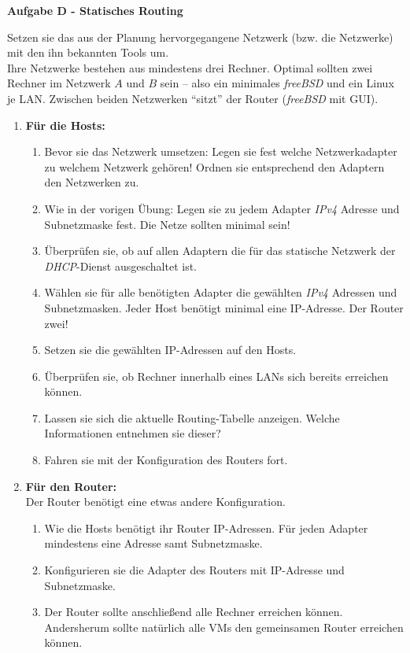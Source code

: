 \documentclass[paper=a4,fontsize=11pt]{scrartcl}%
\begin{document}
\begin{center}\Large{\textbf{Aufgabe D - Statisches Routing}}\end{center}\vskip0.25in
Setzen sie das aus der Planung hervorgegangene Netzwerk (bzw. die Netzwerke) mit den ihn bekannten Tools um.\\
Ihre Netzwerke bestehen aus mindestens drei Rechner. Optimal sollten zwei Rechner im Netzwerk $A$ und $B$ sein -- also ein minimales \emph{freeBSD} und ein Linux je LAN. Zwischen beiden Netzwerken \enquote{sitzt} der Router (\emph{freeBSD} mit GUI).
\begin{enumerate}
	\item \textbf{Für die Hosts:}\\
	\begin{enumerate}
		\item Bevor sie das Netzwerk umsetzen: Legen sie fest welche Netzwerkadapter zu welchem Netzwerk gehören! Ordnen sie entsprechend den Adaptern den Netzwerken zu.
		\item Wie in der vorigen Übung: Legen sie zu jedem Adapter \emph{IPv4} Adresse und Subnetzmaske fest. Die Netze sollten minimal sein!
		\item Überprüfen sie, ob auf allen Adaptern die für das statische Netzwerk der \emph{DHCP}-Dienst ausgeschaltet ist.
		\item Wählen sie für alle benötigten Adapter die gewählten \emph{IPv4} Adressen und Subnetzmasken. Jeder Host benötigt minimal eine IP-Adresse. Der Router zwei!
		\item Setzen sie die gewählten IP-Adressen auf den Hosts.
		\item Überprüfen sie, ob Rechner innerhalb eines LANs sich bereits erreichen können.
		\item Lassen sie sich die aktuelle Routing-Tabelle anzeigen. Welche Informationen entnehmen sie dieser?
		\item Fahren sie mit der Konfiguration des Routers fort.
	\end{enumerate}
	\item \textbf{Für den Router:}\\
	Der Router benötigt eine etwas andere Konfiguration. 
	\begin{enumerate}
		\item Wie die Hosts benötigt ihr Router IP-Adressen. Für jeden Adapter mindestens eine Adresse samt Subnetzmaske. 
		\item Konfigurieren sie die Adapter des Routers mit IP-Adresse und Subnetzmaske.
		\item Der Router sollte anschließend alle Rechner erreichen können. Andersherum sollte natürlich alle VMs den gemeinsamen Router erreichen können.

\end{enumerate}
\end{enumerate}
\end{document}
